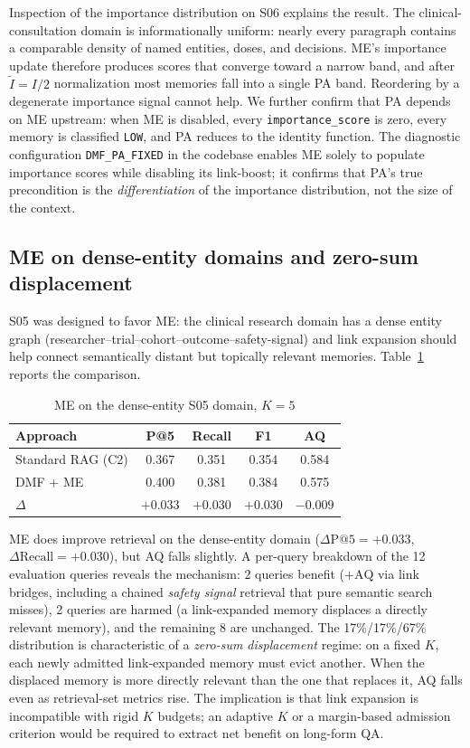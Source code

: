 \documentclass[conference]{IEEEtran}
\begin{document}
Inspection of the importance distribution on S06 explains the result. The clinical-consultation domain is informationally uniform: nearly every paragraph contains a comparable density of named entities, doses, and decisions. ME's importance update therefore produces scores that converge toward a narrow band, and after $\tilde{I}=I/2$ normalization most memories fall into a single PA band. Reordering by a degenerate importance signal cannot help. We further confirm that PA depends on ME upstream: when ME is disabled, every \texttt{importance\_score} is zero, every memory is classified \texttt{LOW}, and PA reduces to the identity function. The diagnostic configuration \texttt{DMF\_PA\_FIXED} in the codebase enables ME solely to populate importance scores while disabling its link-boost; it confirms that PA's true precondition is the \emph{differentiation} of the importance distribution, not the size of the context.

\subsection{ME on dense-entity domains and zero-sum displacement}

S05 was designed to favor ME: the clinical research domain has a dense entity graph (researcher--trial--cohort--outcome--safety-signal) and link expansion should help connect semantically distant but topically relevant memories. Table~\ref{tab:me} reports the comparison.

\begin{table}[t]
\caption{ME on the dense-entity S05 domain, $K{=}5$}
\label{tab:me}
\centering
\renewcommand{\arraystretch}{1.05}
\begin{tabular}{@{}lcccc@{}}
\toprule
\textbf{Approach} & \textbf{P@5} & \textbf{Recall} & \textbf{F1} & \textbf{AQ} \\
\midrule
Standard RAG (C2) & 0.367 & 0.351 & 0.354 & 0.584 \\
DMF + ME          & 0.400 & 0.381 & 0.384 & 0.575 \\
$\Delta$          & $+0.033$ & $+0.030$ & $+0.030$ & $-0.009$ \\
\bottomrule
\end{tabular}
\end{table}

ME does improve retrieval on the dense-entity domain ($\Delta\mathrm{P@5}=+0.033$, $\Delta\mathrm{Recall}=+0.030$), but AQ falls slightly. A per-query breakdown of the 12 evaluation queries reveals the mechanism: 2 queries benefit ($+\mathrm{AQ}$ via link bridges, including a chained \emph{safety signal} retrieval that pure semantic search misses), 2 queries are harmed (a link-expanded memory displaces a directly relevant memory), and the remaining 8 are unchanged. The 17\%/17\%/67\% distribution is characteristic of a \emph{zero-sum displacement} regime: on a fixed $K$, each newly admitted link-expanded memory must evict another. When the displaced memory is more directly relevant than the one that replaces it, AQ falls even as retrieval-set metrics rise. The implication is that link expansion is incompatible with rigid $K$ budgets; an adaptive $K$ or a margin-based admission criterion would be required to extract net benefit on long-form QA.
\end{document}
